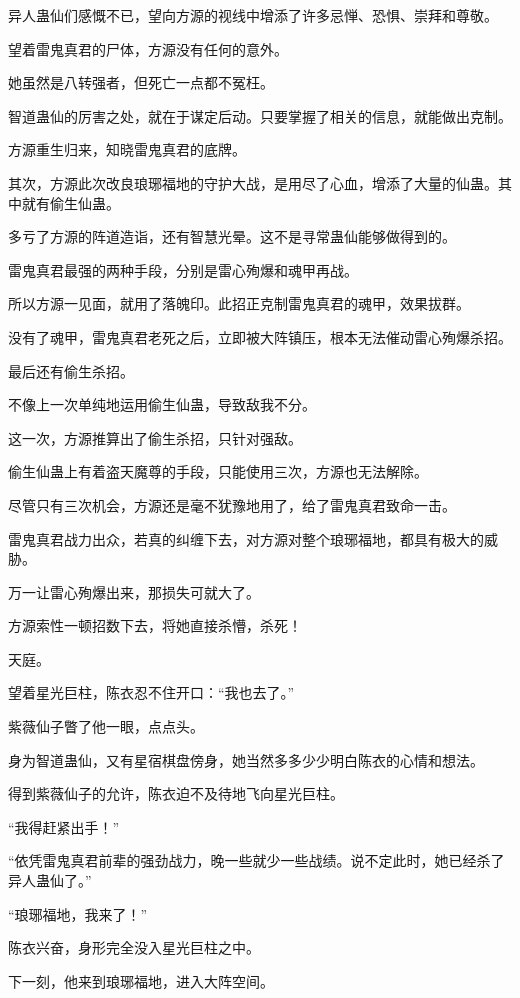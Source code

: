 \begin{this_body}
异人蛊仙们感慨不已，望向方源的视线中增添了许多忌惮、恐惧、崇拜和尊敬。

望着雷鬼真君的尸体，方源没有任何的意外。

她虽然是八转强者，但死亡一点都不冤枉。

智道蛊仙的厉害之处，就在于谋定后动。只要掌握了相关的信息，就能做出克制。

方源重生归来，知晓雷鬼真君的底牌。

其次，方源此次改良琅琊福地的守护大战，是用尽了心血，增添了大量的仙蛊。其中就有偷生仙蛊。

多亏了方源的阵道造诣，还有智慧光晕。这不是寻常蛊仙能够做得到的。

雷鬼真君最强的两种手段，分别是雷心殉爆和魂甲再战。

所以方源一见面，就用了落魄印。此招正克制雷鬼真君的魂甲，效果拔群。

没有了魂甲，雷鬼真君老死之后，立即被大阵镇压，根本无法催动雷心殉爆杀招。

最后还有偷生杀招。

不像上一次单纯地运用偷生仙蛊，导致敌我不分。

这一次，方源推算出了偷生杀招，只针对强敌。

偷生仙蛊上有着盗天魔尊的手段，只能使用三次，方源也无法解除。

尽管只有三次机会，方源还是毫不犹豫地用了，给了雷鬼真君致命一击。

雷鬼真君战力出众，若真的纠缠下去，对方源对整个琅琊福地，都具有极大的威胁。

万一让雷心殉爆出来，那损失可就大了。

方源索性一顿招数下去，将她直接杀懵，杀死！

天庭。

望着星光巨柱，陈衣忍不住开口：“我也去了。”

紫薇仙子瞥了他一眼，点点头。

身为智道蛊仙，又有星宿棋盘傍身，她当然多多少少明白陈衣的心情和想法。

得到紫薇仙子的允许，陈衣迫不及待地飞向星光巨柱。

“我得赶紧出手！”

“依凭雷鬼真君前辈的强劲战力，晚一些就少一些战绩。说不定此时，她已经杀了异人蛊仙了。”

“琅琊福地，我来了！”

陈衣兴奋，身形完全没入星光巨柱之中。

下一刻，他来到琅琊福地，进入大阵空间。


\end{this_body}
